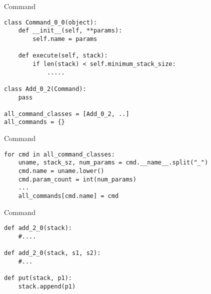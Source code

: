 \documentclass{article}
\begin{document}
\begin{center}Command\end{center}
\begin{lstlisting}
class Command_0_0(object):
    def __init__(self, **params):
        self.name = params

    def execute(self, stack):
        if len(stack) < self.minimum_stack_size:
            .....

class Add_0_2(Command):
    pass

all_command_classes = [Add_0_2, ..]
all_commands = {}

\end{lstlisting}
\newpage

\begin{center}Command\end{center}
\begin{lstlisting}
for cmd in all_command_classes:
    uname, stack_sz, num_params = cmd.__name__.split("_")
    cmd.name = uname.lower()
    cmd.param_count = int(num_params)
    ...
    all_commands[cmd.name] = cmd
\end{lstlisting}
\newpage

\begin{center}Command\end{center}
\begin{lstlisting}
def add_2_0(stack):
    #....

def add_2_0(stack, s1, s2):
    #...

def put(stack, p1):
    stack.append(p1)
\end{lstlisting}
\newpage

\end{document}
